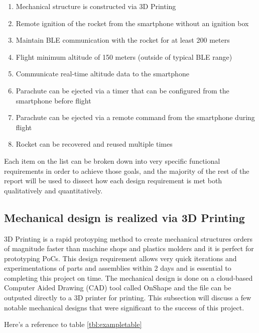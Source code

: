 \documentclass{workreport}
\begin{document}
\begin{body}
	\begin{enumerate}
	\item Mechanical structure is constructed via 3D Printing
  \item Remote ignition of the rocket from the smartphone without an ignition box
	\item Maintain BLE communication with the rocket for at least 200 meters
	\item Flight minimum altitude of 150 meters (outside of typical BLE range)
	\item Communicate real-time altitude data to the smartphone
	\item Parachute can be ejected via a timer that can be configured from the smartphone before flight
	\item Parachute can be ejected via a remote command from the smartphone during flight
	\item Rocket can be recovered and reused multiple times
	\end{enumerate}

	Each item on the list can be broken down into very specific functional requirements in order to achieve those goals, and the majority of the rest of the report will be used to dissect how each design requirement is met both qualitatively and quantitatively.

	\subsection{Mechanical design is realized via 3D Printing}
	3D Printing is a rapid protoyping method to create mechanical structures orders of magnitude faster than machine shops and plastics molders and it is perfect for prototyping PoCs. This design requirement allows very quick iterations and experimentations of parts and assemblies within 2 days and is essential to completing this project on time. The mechanical design is done on a cloud-based Computer Aided Drawing (CAD) tool called OnShape and the file can be outputed directly to a 3D printer for printing. This subsection will discuss a few notable mechanical designs that were significant to the success of this project.

	





Here's a reference to table \ref{tbl:exampletable}

\begin{table}


\end{table}
\end{body}
\end{document}
